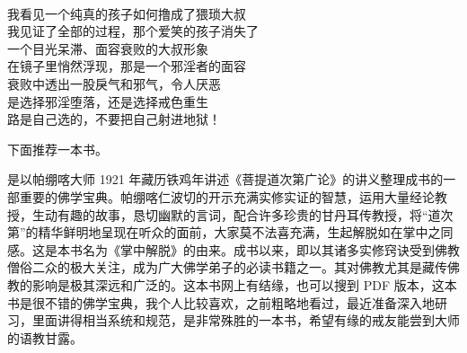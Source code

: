 \begin{poem}[不要把自己射进地狱]
\begin{multicols}{2}
\begin{center}
            ~\\

            我看见一个纯真的孩子如何撸成了猥琐大叔 \\ 我见证了全部的过程，那个爱笑的孩子消失了 \\ 一个目光呆滞、面容衰败的大叔形象 \\ 在镜子里悄然浮现，那是一个邪淫者的面容 \\ 衰败中透出一股戾气和邪气，令人厌恶 \\ 是选择邪淫堕落，还是选择戒色重生 \\ 路是自己选的，不要把自己射进地狱！
        \end{center}
    \end{multicols}
\end{poem}

下面推荐一本书。

\begin{book}[《掌中解脱》]
    是以帕绷喀大师 1921 年藏历铁鸡年讲述《菩提道次第广论》的讲义整理成书的一部重要的佛学宝典。帕绷喀仁波切的开示充满实修实证的智慧，运用大量经论教授，生动有趣的故事，恳切幽默的言词，配合许多珍贵的甘丹耳传教授，将“道次第”的精华鲜明地呈现在听众的面前，大家莫不法喜充满，生起解脱如在掌中之同感。这是本书名为《掌中解脱》的由来。成书以来，即以其诸多实修窍诀受到佛教僧俗二众的极大关注，成为广大佛学弟子的必读书籍之一。其对佛教尤其是藏传佛教的影响是极其深远和广泛的。这本书网上有结缘，也可以搜到 PDF 版本，这本书是很不错的佛学宝典，我个人比较喜欢，之前粗略地看过，最近准备深入地研习，里面讲得相当系统和规范，是非常殊胜的一本书，希望有缘的戒友能尝到大师的语教甘露。
\end{book}
